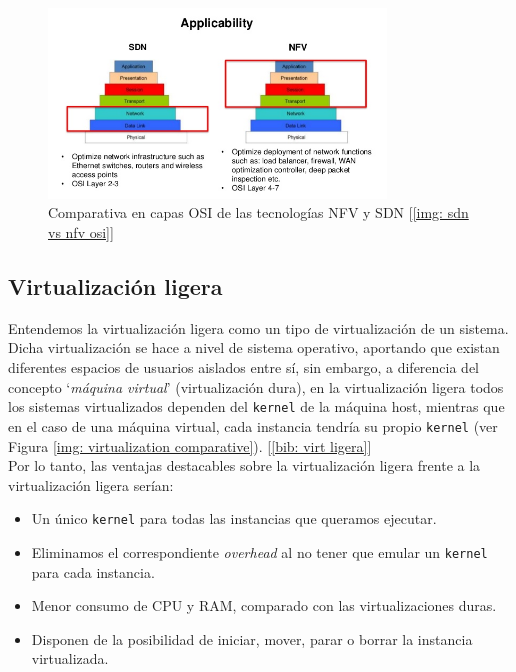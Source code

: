 \documentclass[12pt]{article}
\begin{document}
	\begin{figure}[h!]
		\begin{center}
			\includegraphics[width=0.8\textwidth]{img/sdn-y-nfv.jpg}
			\caption{Comparativa en capas OSI de las tecnologías NFV y SDN [\ref{img: sdn vs nfv osi}] }
			\label{img: sdn + nfv}
		\end{center}
	\end{figure}

	\pagebreak
	
	\subsection{Virtualización ligera}
	\label{sect: virt ligera}
	
	\noindent Entendemos la virtualización ligera como un tipo de virtualización de un sistema. Dicha virtualización se hace a nivel de sistema operativo, aportando que existan diferentes espacios de usuarios aislados entre sí, sin embargo, a diferencia del concepto `\textit{máquina virtual}' (virtualización dura), en la virtualización ligera todos los sistemas virtualizados dependen del \texttt{kernel} de la máquina host, mientras que en el caso de una máquina virtual, cada instancia tendría su propio \texttt{kernel} (ver Figura \ref{img: virtualization comparative}). [\ref{bib: virt ligera}]\\
	
	\noindent Por lo tanto, las ventajas destacables sobre la virtualización ligera frente a la virtualización ligera serían:
	\begin{itemize}
		\item Un único \texttt{kernel} para todas las instancias que queramos ejecutar.
		\item Eliminamos el correspondiente \textit{overhead} al no tener que emular un \texttt{kernel} para cada instancia.
		\item Menor consumo de CPU y RAM, comparado con las virtualizaciones duras.
		\item Disponen de la posibilidad de iniciar, mover, parar o borrar la instancia virtualizada.
	\end{itemize}
	
\end{document}
